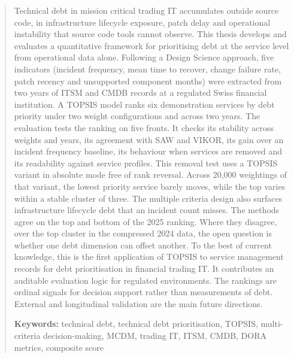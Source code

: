 \documentclass[
  12pt,
  letterpaper,
  12pt,
  oneside,
  english,
  onehalfspacing,
  headsepline]{MastersDoctoralThesis}
\begin{document}
\begin{abstract}
\addchaptertocentry{\abstractname} %
\noindent Technical debt in mission critical trading IT accumulates
outside source code, in infrastructure lifecycle exposure, patch delay
and operational instability that source code tools cannot observe. This
thesis develops and evaluates a quantitative framework for prioritising
debt at the service level from operational data alone. Following a
Design Science approach, five indicators (incident frequency, mean time
to recover, change failure rate, patch recency and unsupported component
months) were extracted from two years of ITSM and CMDB records at a
regulated Swiss financial institution. A TOPSIS model ranks six
demonstration services by debt priority under two weight configurations
and across two years. The evaluation tests the ranking on five fronts.
It checks its stability across weights and years, its agreement with SAW
and VIKOR, its gain over an incident frequency baseline, its behaviour
when services are removed and its readability against service profiles.
This removal test uses a TOPSIS variant in absolute mode free of rank
reversal. Across 20,000 weightings of that variant, the lowest priority
service barely moves, while the top varies within a stable cluster of
three. The multiple criteria design also surfaces infrastructure
lifecycle debt that an incident count misses. The methods agree on the
top and bottom of the 2025 ranking. Where they disagree, over the top
cluster in the compressed 2024 data, the open question is whether one
debt dimension can offset another. To the best of current knowledge,
this is the first application of TOPSIS to service management records
for debt prioritisation in financial trading IT. It contributes an
auditable evaluation logic for regulated environments. The rankings are
ordinal signals for decision support rather than measurements of debt.
External and longitudinal validation are the main future directions.

\vspace{1.5cm}
\noindent\textbf{Keywords:} technical debt, technical debt
prioritisation, TOPSIS, multi-criteria decision-making, MCDM, trading
IT, ITSM, CMDB, DORA metrics, composite score
\end{abstract}


\end{document}
